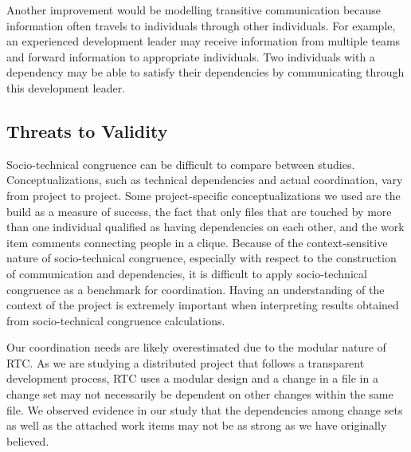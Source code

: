 \documentclass[12pt,oneside]{book}
\begin{document}
Another improvement would be modelling transitive communication because information often travels to individuals through other individuals. For example, an experienced development leader may receive information from multiple teams and forward information to appropriate individuals. Two individuals with a dependency may be able to satisfy their dependencies by communicating through this development leader.

\subsection{Threats to Validity}
\label{sec:threats}


Socio-technical congruence can be difficult to compare between studies. Conceptualizations, such as technical dependencies and actual coordination, vary from project to project. Some project-specific conceptualizations we used are the build as a measure of success, the fact that only files that are touched by more than one individual qualified as having dependencies on each other, and the work item comments connecting people in a clique.
Because of the context-sensitive nature of socio-technical congruence, especially with respect to the construction of communication and dependencies, it is difficult to apply socio-technical congruence as a benchmark for coordination. Having an understanding of the context of the project is extremely important when interpreting results obtained from socio-technical congruence calculations.



Our coordination needs are likely overestimated due to the modular nature of RTC.
As we are studying a distributed project that follows a transparent development process, RTC uses a modular design \cite{maccormack2006} and a change in a file in a change set may not necessarily be dependent on other changes within the same file. 
We observed evidence in our study that the dependencies among change sets as well as the attached work items may not be as strong as we have originally believed.
\end{document}
